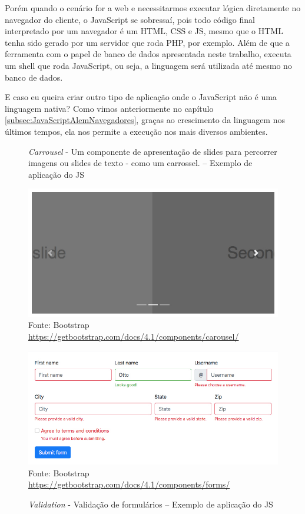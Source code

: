 \documentclass[
	12pt,				%
	openright,			%
	twoside,			%
	a4paper,			%
	english,			%
	brazil				%
	]{abntex2}
\begin{document}
Porém quando o cenário for a web e necessitarmos executar lógica diretamente no navegador do cliente, o JavaScript se sobressaí, pois todo código final interpretado por um navegador é um HTML, CSS e JS, mesmo que o HTML tenha sido gerado por um servidor que roda PHP, por exemplo. Além de que a ferramenta com o papel de banco de dados apresentada neste trabalho, executa um shell que roda JavaScript, ou seja, a linguagem será utilizada até mesmo no banco de dados.

E caso eu queira criar outro tipo de aplicação onde o JavaScript não é uma linguagem nativa? Como vimos anteriormente no capítulo \ref{subsec:JavaScriptAlemNavegadores}, graças ao crescimento da linguagem nos últimos tempos, ela nos permite a execução nos mais diversos ambientes. 

\pagebreak
\begin{figure}[h]
	\centering

	\caption{\textit{Carrousel} - Um componente de apresentação de slides para percorrer imagens ou slides de texto - como um carrossel. -- Exemplo de aplicação do JS} \label{fig:JSExampleCarrousel}
    \includegraphics[scale=0.4]{js-example-carrousel} \\
    Fonte: {Bootstrap \url{https://getbootstrap.com/docs/4.1/components/carousel/}}

    \caption{\textit{Validation} - Validação de formulários -- Exemplo de aplicação do JS} \label{fig:JSExampleValidation}
    \includegraphics[scale=0.45]{js-example-validation} \\
    Fonte: {Bootstrap \url{https://getbootstrap.com/docs/4.1/components/forms/}}
	

\end{figure}
\end{document}
